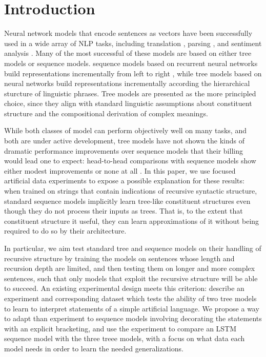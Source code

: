 \section{Introduction}\label{sec:intro}

Neural network models that encode sentences as vectors have been successfully used in a wide array of NLP tasks, including translation \cite{sutskever2014sequence}, parsing \cite{dyer2015transition}, and sentiment analysis \cite{tai2015improved}. Many of the most successful of these models are based on either tree models or sequence models. sequence models based on recurrent neural networks build representations incrementally from left to right \cite{elman1990finding,sutskever2014sequence}, while tree models based on  neural networks \cite{goller1996learning,socher2011semi} build representations incrementally according the hierarchical sturcture of linguistic phrases. Tree models are presented as the more principled choice, since they align with standard linguistic assumptions about constituent structure and the compositional derivation of complex meanings.

While both classes of model can perform objectively well on many tasks, and both are under active development, tree models have not shown the kinds of dramatic performance improvements over sequence models that their billing would lead one to expect: head-to-head comparisons with sequence models show either modest improvements \cite{tai2015improved} or none at all \cite{li2015tree}. 
In this paper, we use focused artificial data experiments to expose a possible explanation for these results: when trained on strings that contain indications of recursive syntactic structure, standard sequence models implicitly learn tree-like constituent structures even though they do not process their inputs as trees. That is, to the extent that constituent structure it useful, they can learn approximations of it without being required to do so by their architecture.

In particular, we aim test standard tree and sequence models on their handling of recursive structure by training the models on sentences whose length and recursion depth are limited, and then testing them on longer and more complex sentences, such that only models that exploit the recursive structure will be able to succeed. An existing experimental design meets this criterion:  describe an experiment and corresponding dataset which tests the ability of two tree models to learn to interpret statements of a simple artificial language. We propose a way to adapt than experiment to sequence models involving decorating the statements with an explicit bracketing, and use the experiment to compare an LSTM sequence model with the three treee models, with a focus on what data each model needs in order to learn the needed generalizations.

